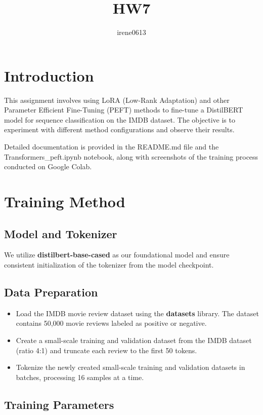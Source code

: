 \documentclass{article}
\title{HW7}
\author{irene0613}
\begin{document}
\maketitle


\section{Introduction}
  
\qquad This assignment involves using LoRA (Low-Rank Adaptation) and other Parameter Efficient Fine-Tuning (PEFT) methods to fine-tune a DistilBERT model for sequence classification on the IMDB dataset. The objective is to experiment with different method configurations and observe their results. 

\quad Detailed documentation is provided in the README.md file and the Transformers\_peft.ipynb notebook, along with screenshots of the training process conducted on Google Colab.

\section{Training Method}

\subsection{Model and Tokenizer}

\qquad We utilize \textbf{distilbert-base-cased} as our foundational model and ensure consistent initialization of the tokenizer from the model checkpoint.

\subsection{Data Preparation}

\begin{itemize}
    \item Load the IMDB movie review dataset using the  \textbf{datasets} library. The dataset contains 50,000 movie reviews labeled as positive or negative.
    \item Create a small-scale training and validation dataset from the IMDB dataset (ratio 4:1) and truncate each review to the first 50 tokens.
    \item Tokenize the newly created small-scale training and validation datasets in batches, processing 16 samples at a time.
\end{itemize}

\subsection{Training Parameters}
\end{document}
